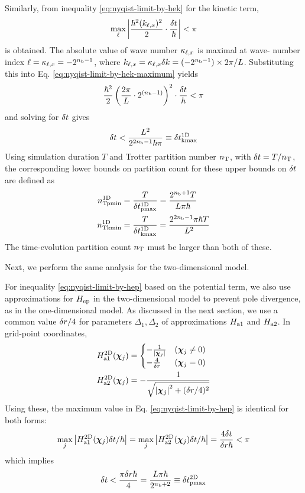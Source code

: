 \documentclass[a4paper,11pt]{article}
\begin{document}
Similarly, from inequality \eqref{eq:nyqist-limit-by-hek} for the kinetic term,
\begin{equation}
\max_{\ell}{\left| \frac{\hbar^2(k_{\ell,x})^2}{2}\cdot\frac{\delta t}{\hbar} \right|} < \pi
\label{eq:nyqist-limit-by-hek-maximum}
\end{equation}
is obtained. The absolute value of wave number $\kappa_{\ell,x}$ is maximal at wave-
number index $\ell=\kappa_{\ell,x}=-2^{n_{\mathrm{b}}-1}$, where
$k_{\ell,x}=\kappa_{\ell,x}\delta k=(-2^{n_{\mathrm{b}}-1})\times2\pi/L$. Substituting this into
Eq. \eqref{eq:nyqist-limit-by-hek-maximum} yields
\begin{equation}
    \frac{\hbar^2}{2}\left(\frac{2\pi}{L}\cdot 2^{(n_{\mathrm{b}}-1)}\right)^2\cdot\frac{\delta t}{\hbar} < \pi
\end{equation}
and solving for $\delta t$ gives
\begin{equation}
\delta t < \frac{L^2}{2^{2n_{\mathrm{b}}-1}\hbar\pi}\equiv\delta t_{\mathrm{kmax}}^{\mathrm{1D}}
 \label{eq:nyqist-limit-by-hek-final}
\end{equation}
Using simulation duration $T$ and Trotter partition number $n_{\mathrm{T}}$, with
$\delta t=T/n_{\mathrm{T}}$, the corresponding lower bounds on partition count for these
upper bounds on $\delta t$ are defined as
\begin{align}
    n_{\mathrm{Tpmin}}^{\mathrm{1D}} &= \frac{T}{\delta t_{\mathrm{pmax}}^{\mathrm{1D}}}=\frac{2^{n_{\mathrm{b}}+1}T}{L\pi\hbar}
    \label{eq:nT-pmin-definition}\\
    n_{\mathrm{Tkmin}}^{\mathrm{1D}} &= \frac{T}{\delta t_{\mathrm{kmax}}^{\mathrm{1D}}}=\frac{2^{2n_{\mathrm{b}}-1}\pi\hbar T}{L^2}
    \label{eq:nT-kmin-definition}
\end{align}
The time-evolution partition count $n_{\mathrm{T}}$ must be larger than both of these.

Next, we perform the same analysis for the two-dimensional model.

For inequality \eqref{eq:nyqist-limit-by-hep} based on the potential term, we
also use approximations for $H_{\mathrm{ep}}$ in the two-dimensional model to prevent pole
divergence, as in the one-dimensional model. As discussed in the next section,
we use a common value $\delta r/4$ for parameters $\Delta_1,\Delta_2$ of
approximations $H_{\mathrm{a1}}$ and $H_{\mathrm{a2}}$. In grid-point coordinates,
\begin{align}
H_{\mathrm{a1}}^{\mathrm{2D}}(\bm{\chi}_{j}) &= \begin{cases}
    -\frac{1}{{\left| \bm{\chi}_{j} \right|}} & (\bm{\chi}_{j}\neq0) \\
    -\frac{4}{\delta r} & (\bm{\chi}_{j}=0)
\end{cases}\\
H_{\mathrm{a2}}^{\mathrm{2D}}(\bm{\chi}_{j}) &= -\frac{1}{\sqrt{{\left| \bm{\chi}_{j} \right|}^2+(\delta r/4)^2}}
\end{align}
Using these, the maximum value in Eq. \eqref{eq:nyqist-limit-by-hep} is
identical for both forms:
\begin{equation}
\max_{j}{\left| H_{\mathrm{a1}}^{\mathrm{2D}}(\bm{\chi}_{j})\delta t/\hbar \right|}
  = \max_{j}{\left| H_{\mathrm{a2}}^{\mathrm{2D}}(\bm{\chi}_{j})\delta t/\hbar \right|}
  = \frac{4\delta t}{\delta r\hbar} < \pi
\end{equation}
which implies
\begin{equation}
\delta t < \frac{\pi\delta r\hbar}{4}
        =\frac{L\pi\hbar}{2^{n_{\mathrm{b}}+2}}
        \equiv\delta t_{\mathrm{pmax}}^{\mathrm{2D}}
 \label{eq:nyqist-limit-by-hep-final-2D}
\end{equation}
\end{document}
